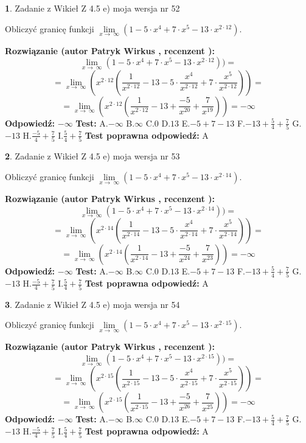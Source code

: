 \documentclass[12pt, a4paper]{article}
\theoremstyle{definition} %
\newtheorem{zad}{}
\newcommand{\zadStart}[1]{\begin{zad}#1\newline}
\newcommand{\zadStop}{\end{zad}}
\newcommand{\rozwStart}[2]{\noindent \textbf{Rozwiązanie (autor #1 , recenzent #2): }\newline}
\newcommand{\rozwStop}{\newline}
\newcommand{\odpStart}{\noindent \textbf{Odpowiedź:}\newline}
\newcommand{\odpStop}{\newline}
\newcommand{\testStart}{\noindent \textbf{Test:}\newline}
\newcommand{\testStop}{\newline}
\newcommand{\kluczStart}{\noindent \textbf{Test poprawna odpowiedź:}\newline}
\newcommand{\kluczStop}{\newline}
\begin{document}
\zadStart{Zadanie z Wikieł Z 4.5 e) moja wersja nr 52}



Obliczyć granicę funkcji  $\lim\limits_{x\to\ \infty}(1 - 5 \cdot x^{4}+7 \cdot x^{5}- 13 \cdot x^{2\cdot12})$.
\zadStop
\rozwStart{Patryk Wirkus}{}
$$\lim\limits_{x\to\ \infty}(1 - 5 \cdot x^{4}+7 \cdot x^{5}- 13 \cdot x^{2\cdot12}))=$$
$$=\lim\limits_{x\to\ \infty}(x^{2\cdot12}(\frac{1}{x^{2\cdot12}}-13 -5 \cdot \frac{x^{4}}{x^{2\cdot12}}+7 \cdot \frac{x^{5}}{x^{2\cdot12}}))=$$
$$=\lim\limits_{x\to\ \infty}(x^{2\cdot12}(\frac{1}{x^{2\cdot12}}-13 + \frac{-5}{x^{20}}+ \frac{7}{x^{19}}))=-\infty$$
\rozwStop
\odpStart
$-\infty$
\odpStop
\testStart
A.$-\infty$ B.$\infty$ C.$0$ D.$13$ E.$-5 + 7 - 13$
F.$-13+\frac{5}{4}+\frac{7}{5}$ G.$-13$
H.$\frac{-5}{4}+\frac{7}{5}$
I.$\frac{5}{4}+\frac{7}{5}$
\testStop
\kluczStart
A
\kluczStop



\zadStart{Zadanie z Wikieł Z 4.5 e) moja wersja nr 53}



Obliczyć granicę funkcji  $\lim\limits_{x\to\ \infty}(1 - 5 \cdot x^{4}+7 \cdot x^{5}- 13 \cdot x^{2\cdot14})$.
\zadStop
\rozwStart{Patryk Wirkus}{}
$$\lim\limits_{x\to\ \infty}(1 - 5 \cdot x^{4}+7 \cdot x^{5}- 13 \cdot x^{2\cdot14}))=$$
$$=\lim\limits_{x\to\ \infty}(x^{2\cdot14}(\frac{1}{x^{2\cdot14}}-13 -5 \cdot \frac{x^{4}}{x^{2\cdot14}}+7 \cdot \frac{x^{5}}{x^{2\cdot14}}))=$$
$$=\lim\limits_{x\to\ \infty}(x^{2\cdot14}(\frac{1}{x^{2\cdot14}}-13 + \frac{-5}{x^{24}}+ \frac{7}{x^{23}}))=-\infty$$
\rozwStop
\odpStart
$-\infty$
\odpStop
\testStart
A.$-\infty$ B.$\infty$ C.$0$ D.$13$ E.$-5 + 7 - 13$
F.$-13+\frac{5}{4}+\frac{7}{5}$ G.$-13$
H.$\frac{-5}{4}+\frac{7}{5}$
I.$\frac{5}{4}+\frac{7}{5}$
\testStop
\kluczStart
A
\kluczStop



\zadStart{Zadanie z Wikieł Z 4.5 e) moja wersja nr 54}



Obliczyć granicę funkcji  $\lim\limits_{x\to\ \infty}(1 - 5 \cdot x^{4}+7 \cdot x^{5}- 13 \cdot x^{2\cdot15})$.
\zadStop
\rozwStart{Patryk Wirkus}{}
$$\lim\limits_{x\to\ \infty}(1 - 5 \cdot x^{4}+7 \cdot x^{5}- 13 \cdot x^{2\cdot15}))=$$
$$=\lim\limits_{x\to\ \infty}(x^{2\cdot15}(\frac{1}{x^{2\cdot15}}-13 -5 \cdot \frac{x^{4}}{x^{2\cdot15}}+7 \cdot \frac{x^{5}}{x^{2\cdot15}}))=$$
$$=\lim\limits_{x\to\ \infty}(x^{2\cdot15}(\frac{1}{x^{2\cdot15}}-13 + \frac{-5}{x^{26}}+ \frac{7}{x^{25}}))=-\infty$$
\rozwStop
\odpStart
$-\infty$
\odpStop
\testStart
A.$-\infty$ B.$\infty$ C.$0$ D.$13$ E.$-5 + 7 - 13$
F.$-13+\frac{5}{4}+\frac{7}{5}$ G.$-13$
H.$\frac{-5}{4}+\frac{7}{5}$
I.$\frac{5}{4}+\frac{7}{5}$
\testStop
\kluczStart
A
\kluczStop
\end{document}
